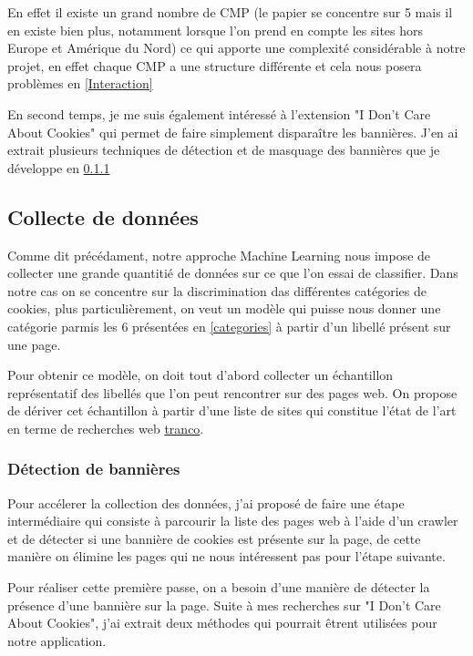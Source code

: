 \documentclass[oneside,a4paper,12pt]{article}
\begin{document}
	En effet il existe un grand nombre de CMP (le papier \cite{consentomatic} se concentre sur 5 mais il en existe bien plus, notamment lorsque l'on prend en compte les sites hors Europe et Amérique du Nord) ce qui apporte une complexité considérable à notre projet, en effet chaque CMP a une structure différente et cela nous posera problèmes en \ref{Interaction}
	
	En second temps, je me suis également intéressé à l'extension "I Don't Care About Cookies" qui permet de faire simplement disparaître les bannières. J'en ai extrait plusieurs techniques de détection et de masquage des bannières que je développe en \ref{DetectionDeBannieres}
	
	\subsection{Collecte de données}
	\label{collecte}
	Comme dit précédament, notre approche Machine Learning nous impose de collecter une grande quantitié de données sur ce que l'on essai de classifier.
	Dans notre cas on se concentre sur la discrimination das différentes catégories de cookies, plus particulièrement, on veut un modèle qui puisse nous donner une catégorie parmis les 6 présentées en \ref{categories} à partir d'un libellé présent sur une page.
	
	Pour obtenir ce modèle, on doit tout d'abord collecter un échantillon représentatif des libellés que l'on peut rencontrer sur des pages web. On propose de dériver cet échantillon à partir d'une liste de sites qui constitue l'état de l'art en terme de recherches web \href{https://tranco-list.eu/}{tranco}.
	
	\subsubsection{Détection de bannières}
	\label{DetectionDeBannieres}
	Pour accélerer la collection des données, j'ai proposé de faire une étape intermédiaire qui consiste à parcourir la liste des pages web à l'aide d'un crawler et de détecter si une bannière de cookies est présente sur la page, de cette manière on élimine les pages qui ne nous intéressent pas pour l'étape suivante.
	
	Pour réaliser cette première passe, on a besoin d'une manière de détecter la présence d'une bannière sur la page. 
	Suite à mes recherches sur "I Don't Care About Cookies", j'ai extrait deux méthodes qui pourrait êtrent utilisées pour notre application.
	
\end{document}
